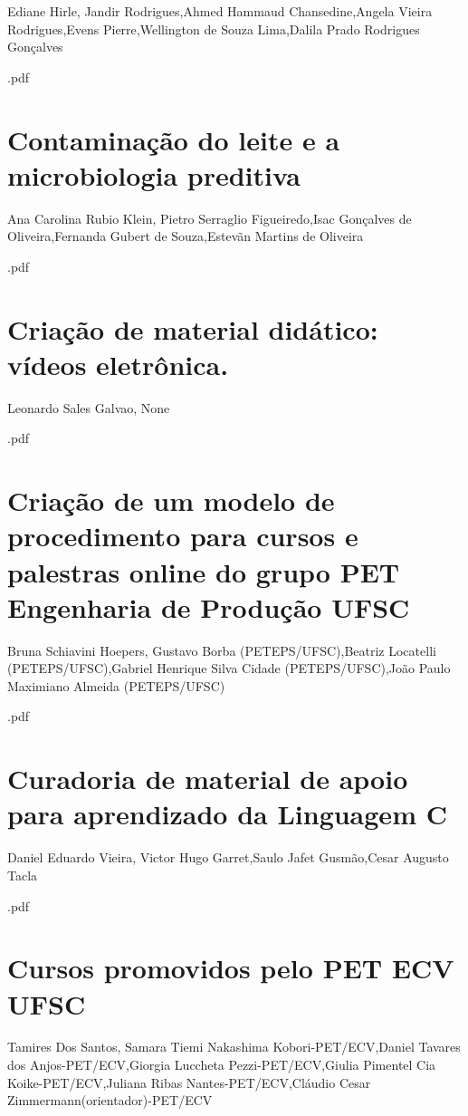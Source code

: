 Ediane Hirle, Jandir Rodrigues,Ahmed Hammaud Chansedine,Angela Vieira Rodrigues,Evens Pierre,Wellington de Souza Lima,Dalila Prado Rodrigues Gonçalves



.pdf\section{Contaminação do leite e a microbiologia preditiva}

Ana Carolina Rubio Klein, Pietro Serraglio Figueiredo,Isac Gonçalves de Oliveira,Fernanda Gubert de Souza,Estevãn Martins de Oliveira



.pdf\section{Criação de material didático: vídeos eletrônica.}

Leonardo Sales Galvao, None



.pdf\section{Criação de um modelo de procedimento para cursos e palestras online do grupo PET Engenharia de Produção UFSC}

Bruna Schiavini Hoepers, Gustavo Borba (PETEPS/UFSC),Beatriz Locatelli (PETEPS/UFSC),Gabriel Henrique Silva Cidade (PETEPS/UFSC),João Paulo Maximiano Almeida (PETEPS/UFSC)



.pdf\section{Curadoria de material de apoio para aprendizado da Linguagem C}

Daniel Eduardo Vieira, Victor Hugo Garret,Saulo Jafet Gusmão,Cesar Augusto Tacla



.pdf\section{Cursos promovidos pelo PET ECV UFSC}

Tamires Dos Santos, Samara Tiemi Nakashima Kobori-PET/ECV,Daniel Tavares dos Anjos-PET/ECV,Giorgia Luccheta Pezzi-PET/ECV,Giulia Pimentel Cia Koike-PET/ECV,Juliana Ribas Nantes-PET/ECV,Cláudio Cesar Zimmermann(orientador)-PET/ECV

